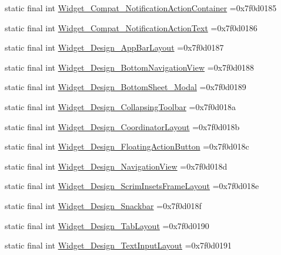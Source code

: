 \begin{DoxyCompactItemize}
\item 
static final int \mbox{\hyperlink{classbr_1_1unb_1_1cic_1_1mp_1_1marketmaster_1_1R_1_1style_a5961f945aefb5f0197919da91fc8f35f}{Widget\+\_\+\+Compat\+\_\+\+Notification\+Action\+Container}} =0x7f0d0185
\item 
static final int \mbox{\hyperlink{classbr_1_1unb_1_1cic_1_1mp_1_1marketmaster_1_1R_1_1style_ad37d6bdab59d96aa3e02d258cddff1e8}{Widget\+\_\+\+Compat\+\_\+\+Notification\+Action\+Text}} =0x7f0d0186
\item 
static final int \mbox{\hyperlink{classbr_1_1unb_1_1cic_1_1mp_1_1marketmaster_1_1R_1_1style_af9fc9dce9a3690b94e4d889a8907a331}{Widget\+\_\+\+Design\+\_\+\+App\+Bar\+Layout}} =0x7f0d0187
\item 
static final int \mbox{\hyperlink{classbr_1_1unb_1_1cic_1_1mp_1_1marketmaster_1_1R_1_1style_a8824d3a86dbd441db80c20dfadbf885e}{Widget\+\_\+\+Design\+\_\+\+Bottom\+Navigation\+View}} =0x7f0d0188
\item 
static final int \mbox{\hyperlink{classbr_1_1unb_1_1cic_1_1mp_1_1marketmaster_1_1R_1_1style_a08ee0aa200867522cb2399c1dec7962e}{Widget\+\_\+\+Design\+\_\+\+Bottom\+Sheet\+\_\+\+Modal}} =0x7f0d0189
\item 
static final int \mbox{\hyperlink{classbr_1_1unb_1_1cic_1_1mp_1_1marketmaster_1_1R_1_1style_a7644e2840a9690d1b567b3c99a9417ea}{Widget\+\_\+\+Design\+\_\+\+Collapsing\+Toolbar}} =0x7f0d018a
\item 
static final int \mbox{\hyperlink{classbr_1_1unb_1_1cic_1_1mp_1_1marketmaster_1_1R_1_1style_a6a4d35c3b350e4b8762f46382f89d754}{Widget\+\_\+\+Design\+\_\+\+Coordinator\+Layout}} =0x7f0d018b
\item 
static final int \mbox{\hyperlink{classbr_1_1unb_1_1cic_1_1mp_1_1marketmaster_1_1R_1_1style_a0f3885e2f5982df8d65c4347b009fc76}{Widget\+\_\+\+Design\+\_\+\+Floating\+Action\+Button}} =0x7f0d018c
\item 
static final int \mbox{\hyperlink{classbr_1_1unb_1_1cic_1_1mp_1_1marketmaster_1_1R_1_1style_a85daaf3208b6a4cd282106f7eb892da7}{Widget\+\_\+\+Design\+\_\+\+Navigation\+View}} =0x7f0d018d
\item 
static final int \mbox{\hyperlink{classbr_1_1unb_1_1cic_1_1mp_1_1marketmaster_1_1R_1_1style_a2ca30600159319049abf15f73b99f8db}{Widget\+\_\+\+Design\+\_\+\+Scrim\+Insets\+Frame\+Layout}} =0x7f0d018e
\item 
static final int \mbox{\hyperlink{classbr_1_1unb_1_1cic_1_1mp_1_1marketmaster_1_1R_1_1style_a8baff92ba853b852a18e056ed85d7f0a}{Widget\+\_\+\+Design\+\_\+\+Snackbar}} =0x7f0d018f
\item 
static final int \mbox{\hyperlink{classbr_1_1unb_1_1cic_1_1mp_1_1marketmaster_1_1R_1_1style_abeff3e510d5142931a2aa2d21b3b1ec0}{Widget\+\_\+\+Design\+\_\+\+Tab\+Layout}} =0x7f0d0190
\item 
static final int \mbox{\hyperlink{classbr_1_1unb_1_1cic_1_1mp_1_1marketmaster_1_1R_1_1style_acdb8daeb5a5877ccfbdf2e62c3df1df9}{Widget\+\_\+\+Design\+\_\+\+Text\+Input\+Layout}} =0x7f0d0191
\end{DoxyCompactItemize}


